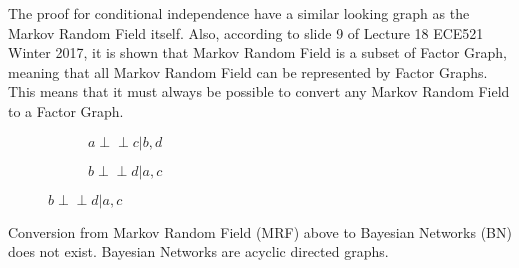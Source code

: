 \documentclass[a4paper,12pt]{article}
\newcommand{\ci}{\perp\!\!\!\perp}
\newcounter{subsubsubsection}[subsubsection]
\begin{document}
\clearpage 
\begin{figure}[!htb]
\centering
{}
\end{figure}

The proof for conditional independence have a similar looking graph as the Markov Random Field itself. Also, according to slide 9 of Lecture 18 ECE521 Winter 2017, it is shown that Markov Random Field is a subset of Factor Graph, meaning that all Markov Random Field can be represented by Factor Graphs. This means that it must always be possible to convert any Markov Random Field to a Factor Graph. 

\begin{figure}[!htb]
\centering
\begin{subfigure}[t]{0.48\textwidth}
	\centering	
    \caption*{$a \ci c | b, d$}
\end{subfigure}
\begin{subfigure}[t]{0.48\textwidth}
	\centering	
    \caption*{$b \ci d | a, c$}
\end{subfigure}
\end{figure}

\clearpage 
Conversion from Markov Random Field (MRF) above to Bayesian Networks (BN) does not exist. Bayesian Networks are acyclic directed graphs. 
\end{document}
